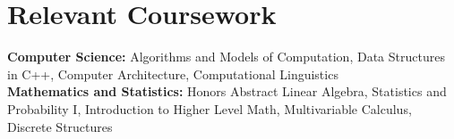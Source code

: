 \documentclass{article}
\begin{document}
\section{Relevant Coursework}
\begin{itemize}[leftmargin=0.15in, label={}]
	\small{\item{
		           {\textbf{Computer Science:} Algorithms and Models of Computation, Data Structures in C++, Computer Architecture, Computational Linguistics \\
               \textbf{Mathematics and Statistics:} Honors Abstract Linear Algebra, Statistics and Probability I, Introduction to Higher Level Math, Multivariable Calculus, Discrete Structures}\\
		      }}
\end{itemize}
\end{document}
